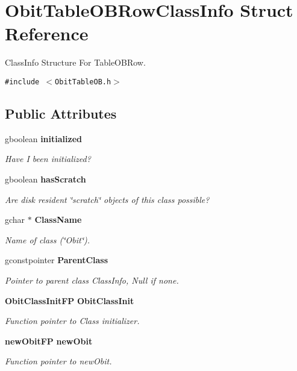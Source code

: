 \section{Obit\-Table\-OBRow\-Class\-Info Struct Reference}
\label{structObitTableOBRowClassInfo}
Class\-Info Structure For Table\-OBRow.  


{\tt \#include $<$Obit\-Table\-OB.h$>$}

\subsection*{Public Attributes}
\begin{CompactItemize}
\item 
gboolean {\bf initialized}
\begin{CompactList}\small\item\em Have I been initialized? \item\end{CompactList}\item 
gboolean {\bf has\-Scratch}
\begin{CompactList}\small\item\em Are disk resident \char`\"{}scratch\char`\"{} objects of this class possible? \item\end{CompactList}\item 
gchar $\ast$ {\bf Class\-Name}
\begin{CompactList}\small\item\em Name of class (\char`\"{}Obit\char`\"{}). \item\end{CompactList}\item 
gconstpointer {\bf Parent\-Class}
\begin{CompactList}\small\item\em Pointer to parent class Class\-Info, Null if none. \item\end{CompactList}\item 
{\bf Obit\-Class\-Init\-FP} {\bf Obit\-Class\-Init}
\begin{CompactList}\small\item\em Function pointer to Class initializer. \item\end{CompactList}\item 
{\bf new\-Obit\-FP} {\bf new\-Obit}
\begin{CompactList}\small\item\em Function pointer to new\-Obit. \item\end{CompactList}\item 

\end{CompactItemize}
